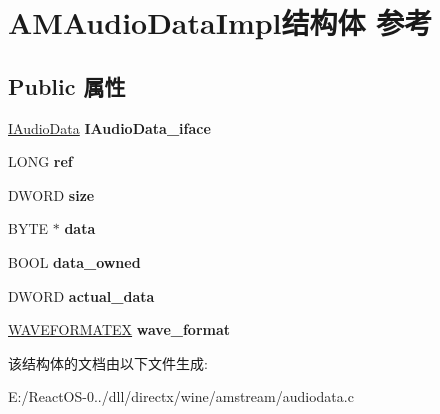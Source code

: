 \hypertarget{struct_a_m_audio_data_impl}{}\section{A\+M\+Audio\+Data\+Impl结构体 参考}
\label{struct_a_m_audio_data_impl}
\subsection*{Public 属性}
\begin{DoxyCompactItemize}
\item 
\mbox{\label{struct_a_m_audio_data_impl_afc965e33379b1a5a9ec76204acac0087}} 
\hyperlink{interface_i_audio_data}{I\+Audio\+Data} {\bfseries I\+Audio\+Data\+\_\+iface}
\item 
\mbox{\label{struct_a_m_audio_data_impl_abe2dd9912cf567a0cbb764ddbc574216}} 
L\+O\+NG {\bfseries ref}
\item 
\mbox{\label{struct_a_m_audio_data_impl_aff74edc774a067c501bf44bbd8407e94}} 
D\+W\+O\+RD {\bfseries size}
\item 
\mbox{\label{struct_a_m_audio_data_impl_a2ee755781c2fc8d8d39ec3f0314ca597}} 
B\+Y\+TE $\ast$ {\bfseries data}
\item 
\mbox{\label{struct_a_m_audio_data_impl_abfb4171409266964c465abffe2eb0515}} 
B\+O\+OL {\bfseries data\+\_\+owned}
\item 
\mbox{\label{struct_a_m_audio_data_impl_adbd84686e3b9b3df472464150000e848}} 
D\+W\+O\+RD {\bfseries actual\+\_\+data}
\item 
\mbox{\label{struct_a_m_audio_data_impl_a9c4d07f4f84d13361099dbe363b4210a}} 
\hyperlink{struct_w_a_v_e_f_o_r_m_a_t_e_x}{W\+A\+V\+E\+F\+O\+R\+M\+A\+T\+EX} {\bfseries wave\+\_\+format}
\end{DoxyCompactItemize}


该结构体的文档由以下文件生成\+:\begin{DoxyCompactItemize}
\item 
E\+:/\+React\+O\+S-\/0../dll/directx/wine/amstream/audiodata.\+c\end{DoxyCompactItemize}

